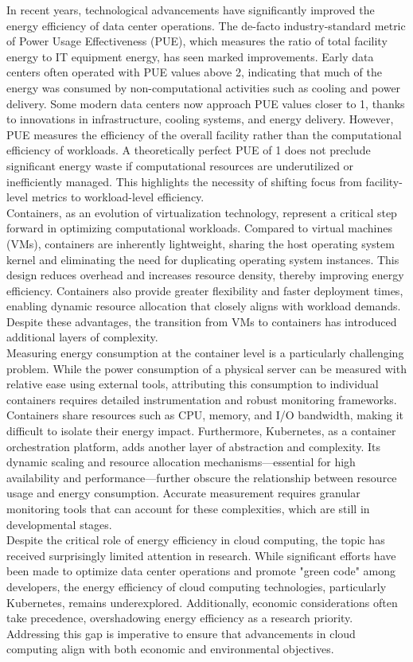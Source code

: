 In recent years, technological advancements have significantly improved the energy efficiency of data center operations. The de-facto industry-standard metric of Power Usage Effectiveness (PUE), which measures the ratio of total facility energy to IT equipment energy, has seen marked improvements. Early data centers often operated with PUE values above 2, indicating that much of the energy was consumed by non-computational activities such as cooling and power delivery. Some modern data centers now approach PUE values closer to 1, thanks to innovations in infrastructure, cooling systems, and energy delivery. However, PUE measures the efficiency of the overall facility rather than the computational efficiency of workloads. A theoretically perfect PUE of 1 does not preclude significant energy waste if computational resources are underutilized or inefficiently managed. This highlights the necessity of shifting focus from facility-level metrics to workload-level efficiency.\\
Containers, as an evolution of virtualization technology, represent a critical step forward in optimizing computational workloads. Compared to virtual machines (VMs), containers are inherently lightweight, sharing the host operating system kernel and eliminating the need for duplicating operating system instances. This design reduces overhead and increases resource density, thereby improving energy efficiency. Containers also provide greater flexibility and faster deployment times, enabling dynamic resource allocation that closely aligns with workload demands. Despite these advantages, the transition from VMs to containers has introduced additional layers of complexity.\\
Measuring energy consumption at the container level is a particularly challenging problem. While the power consumption of a physical server can be measured with relative ease using external tools, attributing this consumption to individual containers requires detailed instrumentation and robust monitoring frameworks. Containers share resources such as CPU, memory, and I/O bandwidth, making it difficult to isolate their energy impact. Furthermore, Kubernetes, as a container orchestration platform, adds another layer of abstraction and complexity. Its dynamic scaling and resource allocation mechanisms—essential for high availability and performance—further obscure the relationship between resource usage and energy consumption. Accurate measurement requires granular monitoring tools that can account for these complexities, which are still in developmental stages.\\
Despite the critical role of energy efficiency in cloud computing, the topic has received surprisingly limited attention in research. While significant efforts have been made to optimize data center operations and promote "green code" among developers, the energy efficiency of cloud computing technologies, particularly Kubernetes, remains underexplored. Additionally, economic considerations often take precedence, overshadowing energy efficiency as a research priority. Addressing this gap is imperative to ensure that advancements in cloud computing align with both economic and environmental objectives.

